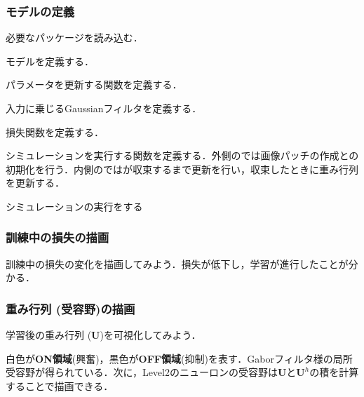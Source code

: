 \subsubsection{モデルの定義}
必要なパッケージを読み込む．

モデルを定義する．

パラメータを更新する関数を定義する．

入力に乗じるGaussianフィルタを定義する．



損失関数を定義する．

シミュレーションを実行する関数を定義する．外側のでは画像パッチの作成との初期化を行う．内側のではが収束するまで更新を行い，収束したときに重み行列を更新する．

シミュレーションの実行をする

\subsubsection{訓練中の損失の描画}
訓練中の損失の変化を描画してみよう．損失が低下し，学習が進行したことが分かる．


\subsubsection{重み行列 (受容野)の描画}
学習後の重み行列 ($\mathbf{U}$)を可視化してみよう．


白色が\textbf{ON領域}(興奮)，黒色が\textbf{OFF領域}(抑制)を表す．Gaborフィルタ様の局所受容野が得られている．次に，Level2のニューロンの受容野は$\mathbf{U}$と$\mathbf{U}^h$の積を計算することで描画できる．


